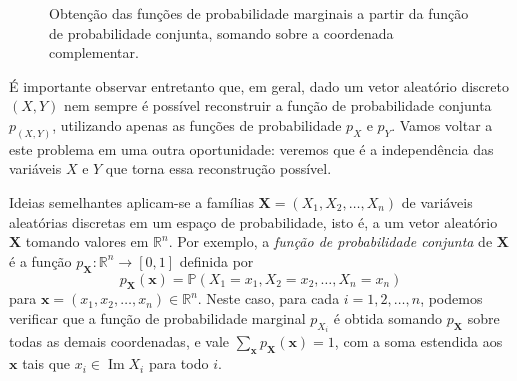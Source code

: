 \documentclass[12pt,portuguese]{article}
\theoremstyle{definition}
\begin{document}
\begin{figure}[H]
\centering
{}
\caption{Obtenção das funções de probabilidade marginais a partir da função
de probabilidade conjunta, somando sobre a coordenada complementar.}
\label{fig:conjunta-marginais}
\end{figure}

É importante observar entretanto que, em geral, 
dado um vetor aleatório discreto $(X,Y)$ nem sempre é possível
reconstruir a função de probabilidade conjunta $p_{(X,Y)}$, 
utilizando apenas as funções de probabilidade $p_{X}$ e $p_{Y}$.
Vamos voltar a este problema em uma outra oportunidade: veremos que 
é a independência das variáveis $X$ e $Y$ que torna essa reconstrução possível. 


\bigskip 

Ideias semelhantes aplicam-se a famílias
$\mathbf{X} = (X_1, X_2, \dots, X_n)$ de variáveis aleatórias discretas em um
espaço de probabilidade, isto é, a um vetor aleatório $\mathbf{X}$
tomando valores em $\mathbb{R}^n$. 
Por exemplo, a \emph{função de probabilidade conjunta} de $\mathbf{X}$ é a função
$p_{\mathbf{X}}:\mathbb{R}^n\to [0,1]$ definida por
\begin{equation}\label{eq:conjunta-vetor-n}
  p_{\mathbf{X}}(\mathbf{x}) = \mathbb{P}(X_1 = x_1, X_2 = x_2, \dots, X_n = x_n)
\end{equation}
para $\mathbf{x} = (x_1, x_2, \dots, x_n) \in \mathbb{R}^n$.
Neste caso, para cada $i=1,2,\ldots ,n$, podemos verificar que a 
função de probabilidade marginal $p_{X_i}$
é obtida somando $p_{\mathbf{X}}$ sobre todas as demais coordenadas, e vale
$\sum_{\mathbf{x}} p_{\mathbf{X}}(\mathbf{x}) = 1$, com a soma estendida aos
$\mathbf{x}$ tais que $x_i\in\operatorname{Im}X_i$ para todo $i$.
\end{document}

